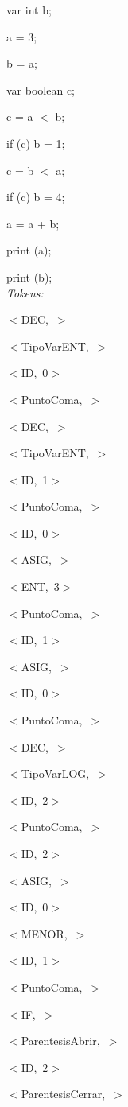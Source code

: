 \documentclass[a4paper, 12pt]{article}
\begin{document}
var int b;

a = 3;

b = a;

 var boolean c;
 
c = a  $<$  b;

if (c) b  =  1;

c = b  $<$  a;

if (c) b  =  4;

 a = a  +  b;
 
print (a);

print (b);\medskip \\
\emph{Tokens:}

\mbox{$<$DEC, $>$ }


\mbox{$<$TipoVarENT, $>$} 


\mbox{$<$ID, 0$>$ }


\mbox{$<$PuntoComa, $>$} 


\mbox{$<$DEC, $>$}


\mbox{$<$TipoVarENT, $>$ }


\mbox{$<$ID, 1$>$ }


\mbox{$<$PuntoComa, $>$ }


\mbox{$<$ID, 0$>$ }


\mbox{$<$ASIG, $>$ }


\mbox{$<$ENT, 3$>$ }


\mbox{$<$PuntoComa, $>$ }


\mbox{$<$ID, 1$>$ }


\mbox{$<$ASIG, $>$ }


\mbox{$<$ID, 0$>$} 


\mbox{$<$PuntoComa, $>$ }


\mbox{$<$DEC, $>$ }


\mbox{$<$TipoVarLOG, $>$ }


\mbox{$<$ID, 2$>$ }


\mbox{$<$PuntoComa, $>$ }


\mbox{$<$ID, 2$>$ }


\mbox{$<$ASIG, $>$ }


\mbox{$<$ID, 0$>$ }


\mbox{$<$MENOR, $>$ }


\mbox{$<$ID, 1$>$ }


\mbox{$<$PuntoComa, $>$ }


\mbox{$<$IF, $>$ }


\mbox{$<$ParentesisAbrir, $>$ }


\mbox{$<$ID, 2$>$ }


\mbox{$<$ParentesisCerrar, $>$} 
\end{document}
